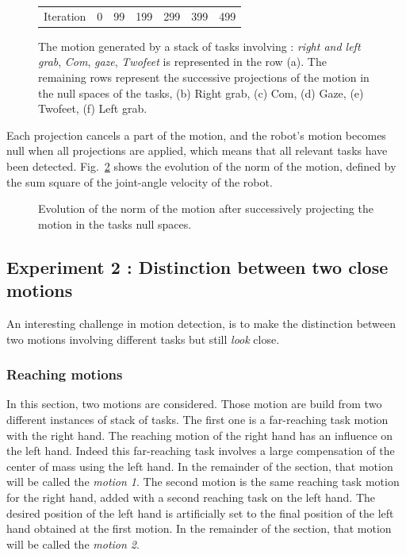 \documentclass[letterpaper, 10pt, conference]{ieeeconf}      %
\begin{document}
\begin{figure}[t]
\begin{tabular}{c@{}c@{}c@{}c@{}c@{}c@{}c}
\\
Iteration & 0 & 99 & 199 & 299 & 399 & 499\\
\end{tabular}
\caption{The motion generated by a stack of tasks involving :
\emph{right and left grab}, \emph{Com}, \emph{gaze}, \emph{Twofeet} is represented in the row (a).
The remaining rows represent the successive projections of the motion in the null spaces of the tasks,
(b) Right grab, (c) Com, (d) Gaze, (e) Twofeet, (f) Left grab.}
\label{fig:snapshotXpqdot}
\end{figure}
Each projection cancels a part of the motion, and the robot's motion becomes null when all
projections are applied,
which means that all relevant tasks have been detected.
Fig.~\ref{fig:xp3Pqdot} shows the evolution of the norm of the motion,
defined by the sum square of the joint-angle velocity of the robot.
\begin{figure}[t]
\begin{center}
\resizebox{.48\textwidth}{!} {
      
    }
\end{center}
\caption{Evolution of the norm of the motion after successively projecting the motion in the
	tasks null spaces.}
\label{fig:xp3Pqdot}
\end{figure}

\subsection{Experiment 2 : Distinction between two close motions}
\label{sec:distinc}
An interesting challenge in motion detection,
is to make the distinction between two motions
involving different tasks but still \emph{look} close.

\subsubsection{Reaching motions}
\label{sec:distinc1}
In this section, two motions are considered. Those motion are build from two different instances of stack of tasks.
The first one is a far-reaching task motion with the right hand.
The reaching motion of the right hand has an influence on the left hand.
Indeed this far-reaching task involves a large compensation of the center of mass
using the left hand.
In the remainder of the section, that motion will be called the
\emph{motion 1}.
The second motion is the same reaching task motion for the right hand, added with a
second reaching task on the left hand. The desired position of the left
hand is artificially set to the final position of the left hand obtained at the first motion.
In the remainder of the section, that motion will be called the
\emph{motion 2}.
\end{document}
